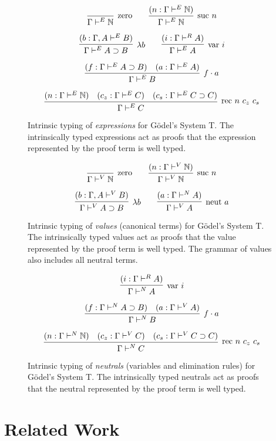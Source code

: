 \documentclass[preprint,nonatbib]{sigplanconf}
\numberwithin{mysubdfn}{mydfn}
\def\arr{\supset}
\def\app{\cdot}
\def\lam{\lambda}
\def\nat{\mathbb{N}}
\newcommand{\con}[1]{\textmd{#1}}
\newcommand{\fun}[1]{\textmd{#1}}
\newcommand{\type}[1]{\Gamma \vdash^E #1}
\newcommand{\ctype}[2]{\Gamma , #1 \vdash^E #2}
\newcommand{\typv}[1]{\Gamma \vdash^V #1}
\newcommand{\ctypv}[2]{\Gamma , #1 \vdash^V #2}
\newcommand{\typn}[1]{\Gamma \vdash^N #1}
\newcommand{\typr}[1]{\Gamma \vdash^R #1}
\begin{document}
\begin{figure}
\caption{
Intrinsic typing of {\it expressions} for G{\"o}del's System T. The
intrinsically typed expressions act as proofs that the expression
represented by the proof term is well typed.
}
$$
\infer
  [\con{zero}]
  {\type{\nat}}
{}
\qquad
\infer
  [\con{suc} ~ n]
  {\type{\nat}}
{
  (n : \type{\nat})
}
$$

$$
\infer
  [\lam b]
  {\type{A \arr B}}
{
  (b : \ctype{A}{B})
}
\qquad
\infer
  [\fun{var} ~ i]
  {\type{A}}
{
  (i : \typr{A})
}
$$

$$
\infer
  [f \app a]
  {\type{B}}
{
  (f : \type{A \arr B})
  &
  (a : \type{A})
}
$$

$$
\infer
  [\fun{rec} ~ n ~ c_z ~ c_s]
  {\type{C}}
{
  (n : \type{\nat})
  &
  (c_z : \type{C})
  &
  (c_s : \type{C \arr C})
}
$$
\label{fig:type}
\end{figure}

\begin{figure}
\caption{
Intrinsic typing of {\it values} (canonical terms) for G{\"o}del's System T.
The intrinsically typed values act as proofs that the value
represented by the proof term is well typed. The grammar of values
also includes all neutral terms.
}
$$
\infer
  [\con{zero}]
  {\typv{\nat}}
{}
\qquad
\infer
  [\con{suc} ~ n]
  {\typv{\nat}}
{
  (n : \typv{\nat})
}
$$

$$
\infer
  [\lam b]
  {\typv{A \arr B}}
{
  (b : \ctypv{A}{B})
}
\qquad
\infer
  [\fun{neut} ~ a]
  {\typv{A}}
{
  (a : \typn{A})
}
$$
\label{fig:typv}
\end{figure}

\begin{figure}
\caption{
Intrinsic typing of {\it neutrals} (variables and elimination rules) 
for G{\"o}del's System T.
The intrinsically typed neutrals act as proofs that the neutral
represented by the proof term is well typed.
}

$$
\infer
  [\fun{var} ~ i]
  {\typn{A}}
{
  (i : \typr{A})
}
$$

$$
\infer
  [f \app a]
  {\typn{B}}
{
  (f : \typn{A \arr B})
  &
  (a : \typv{A})
}
$$

$$
\infer
  [\fun{rec} ~ n ~ c_z ~ c_s]
  {\typn{C}}
{
  (n : \typn{\nat})
  &
  (c_z : \typv{C})
  &
  (c_s : \typv{C \arr C})
}
$$
\label{fig:typn}
\end{figure}


\section{Related Work}
\end{document}
